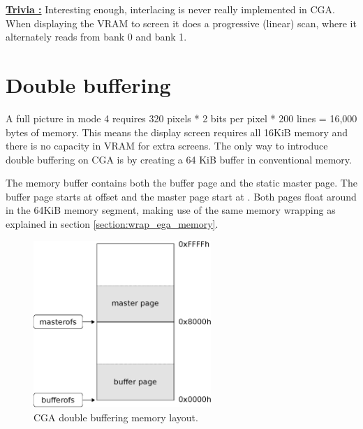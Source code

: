 \documentclass[book.tex]{subfiles}
\begin{document}
\par
\textbf{\underline{Trivia :}} Interesting enough, interlacing is never really implemented in CGA. When displaying the VRAM to screen it does a progressive (linear) scan, where it alternately reads from bank 0 and bank 1.\\
\par


\section{Double buffering}
A full picture in mode 4 requires 320 pixels * 2 bits per pixel * 200 lines = 16,000 bytes of memory. This means the display screen requires all 16KiB memory and there is no capacity in VRAM for extra screens. The only way to introduce double buffering on CGA is by creating a 64 KiB buffer in conventional memory.  \\
\par
\begin{minipage}{\textwidth}
  
\end{minipage}
\label{state_type}
\par
The memory buffer contains both the buffer page and the static master page. The buffer page starts at offset  and the master page start at . Both pages float around in the 64KiB memory segment, making use of the same memory wrapping as explained in section \ref{section:wrap_ega_memory}.


\begin{figure}[H]
\centering
\includegraphics[width=0.6\textwidth]{imgs/drawings/cga_screenseg.eps}
\caption{CGA double buffering memory layout.}
\label{fig:cga_screenseg}
\end{figure}
\end{document}
